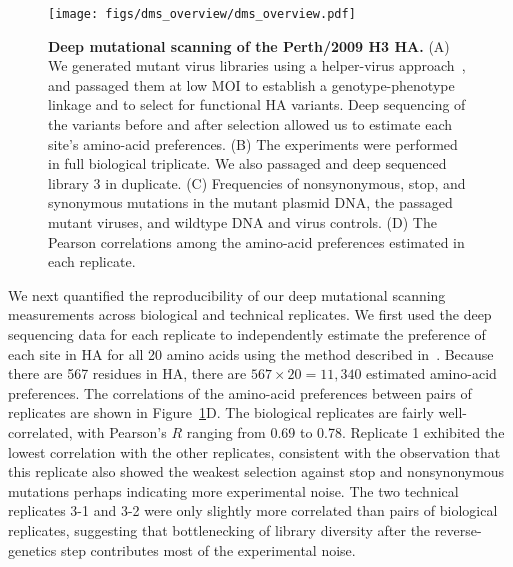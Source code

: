 \documentclass[9pt,twocolumn,twoside]{pnas-new}
\begin{document}
\begin{figure}
\centering
\texttt{[image: figs/dms\_overview/dms\_overview.pdf]}
\caption{\label{fig:dms_overview}
{\bf Deep mutational scanning of the Perth/2009 H3 HA.}
(A) We generated mutant virus libraries using a helper-virus approach~\cite{doud2016accurate}, and passaged them at low MOI to establish a genotype-phenotype linkage and to select for functional HA variants. 
Deep sequencing of the variants before and after selection allowed us to estimate each site's amino-acid preferences.
(B) The experiments were performed in full biological triplicate. 
We also passaged and deep sequenced library 3 in duplicate.
(C) Frequencies of nonsynonymous, stop, and synonymous mutations in the mutant plasmid DNA, the passaged mutant viruses, and wildtype DNA and virus controls. 
(D) The Pearson correlations among the amino-acid preferences estimated in each replicate. 
}
\end{figure}

We next quantified the reproducibility of our deep mutational scanning measurements across biological and technical replicates. 
We first used the deep sequencing data for each replicate to independently estimate the preference of each site in HA for all 20 amino acids using the method described in~\cite{bloom2015software}.
Because there are 567 residues in HA, there are $567 \times 20 = 11,340$ estimated amino-acid preferences.
The correlations of the amino-acid preferences between pairs of replicates are shown in Figure~\ref{fig:dms_overview}D.
The biological replicates are fairly well-correlated, with Pearson's $R$ ranging from 0.69 to 0.78. 
Replicate 1 exhibited the lowest correlation with the other replicates, consistent with the observation that this replicate also showed the weakest selection against stop and nonsynonymous mutations perhaps indicating more experimental noise.
The two technical replicates 3-1 and 3-2 were only slightly more correlated than pairs of biological replicates, suggesting that bottlenecking of library diversity after the reverse-genetics step contributes most of the experimental noise.
\end{document}

